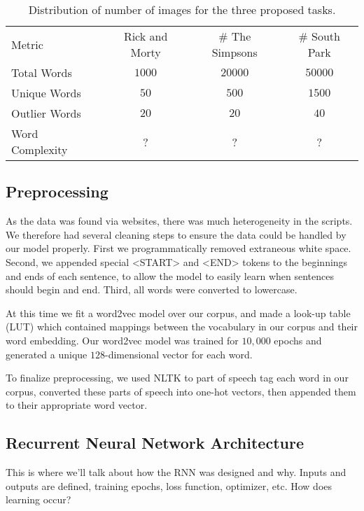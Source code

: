 \documentclass[conference]{IEEEtran}
\begin{document}
\begin{table}[tb]
\label{tab:data}
\caption{Distribution of number of images for the three proposed tasks.
}
\begin{center}
\begin{tabular}{lccc}

Metric & Rick and Morty & \# The Simpsons & \# South Park\\

Total Words & $1000$ & $20000$ & $50000$\\ 
Unique Words & $50$ & $500$ & $1500$\\
Outlier Words & $20$ & $20$ & $40$\\
Word Complexity & ? & ? & ?\\

\end{tabular}
\end{center}
\vspace{-1em}
\end{table}

\subsection{Preprocessing}

As the data was found via websites, there was much heterogeneity in the scripts.  We therefore had several cleaning steps to ensure the data could be handled by our model properly.  First we programmatically removed extraneous white space. Second, we appended special <START> and <END> tokens to the beginnings and ends of each sentence, to allow the model to easily learn when sentences should begin and end.  Third, all words were converted to lowercase.

At this time we fit a word2vec model over our corpus, and made a look-up table (LUT) which contained mappings between the vocabulary in our corpus and their word embedding.  Our word2vec model was trained for $10,000$ epochs and generated a unique $128$-dimensional vector for each word.

To finalize preprocessing, we used NLTK to part of speech tag each word in our corpus, converted these parts of speech into one-hot vectors, then appended them to their appropriate word vector.

\subsection{Recurrent Neural Network Architecture}

This is where we'll talk about how the RNN was designed and why.  Inputs and outputs are defined, training epochs, loss function, optimizer, etc.  How does learning occur?
\end{document}
